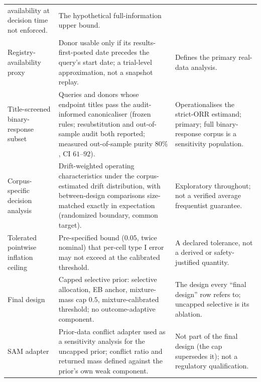 \documentclass[11pt]{article}
\begin{document}
\begin{longtable}{p{} p{} p{}}
availability at decision time not enforced. & The hypothetical
full-information upper bound. \\
Registry-availability proxy & Donor usable only if its results-first-posted
date precedes the query's start date; a trial-level approximation, not a
snapshot replay. & Defines the primary real-data analysis. \\
Title-screened binary-response subset & Queries and donors whose endpoint titles pass
the audit-informed canonicaliser (frozen rules; resubstitution and
out-of-sample audit both reported; measured out-of-sample purity $80\%$,
CI $61$--$92$). & Operationalises the strict-ORR
estimand; primary; full binary-response corpus is a sensitivity
population. \\
Corpus-specific decision analysis & Drift-weighted operating
characteristics under the corpus-estimated drift distribution, with
between-design comparisons size-matched exactly in expectation
(randomized boundary, common target). & Exploratory throughout; not a
verified average frequentist guarantee. \\
Tolerated pointwise inflation ceiling & Pre-specified bound ($0.05$, twice
nominal) that per-cell type I error may not exceed at the calibrated
threshold. & A declared tolerance, not a derived or safety-justified
quantity. \\
Final design & Capped selective prior: selective allocation, EB anchor,
mixture-mass cap $0.5$, mixture-calibrated threshold; no outcome-adaptive
component. & The design every ``final design'' row refers to; uncapped
selective is its ablation. \\
SAM adapter & Prior-data conflict adapter used as a sensitivity analysis for
the uncapped prior; conflict ratio and returned mass defined against the
prior's own weak component. & Not part of the final design (the cap
supersedes it); not a regulatory qualification. \\
\bottomrule
\end{longtable}

\end{document}
